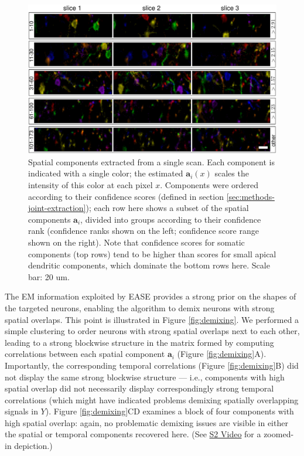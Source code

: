 \documentclass[10pt,letterpaper]{article}
\def \videoTwoURL{https://www.dropbox.com/s/jmkedq2f3nniy0a/demixing_example.avi?dl=0}
\begin{document}
{\begin{figure}[t!]
	\centering
	\includegraphics[width=1\textwidth]{Figs/fig_overlap_A.pdf}
	\caption{Spatial components extracted from a single scan.  Each component is indicated with a single color; the estimated $\bm{a}_i(x)$ scales the intensity of this color at each pixel $x$.  Components were ordered according to their confidence scores (defined in section \ref{sec:methods-joint-extraction}); each row here shows a subset of the spatial components $\bm{a}_i$, divided into groups according to their confidence rank (confidence ranks shown on the left; confidence score range shown on the right).  Note that confidence scores for somatic components (top rows) tend to be higher than scores for small apical dendritic components, which dominate the bottom rows here. Scale bar: 20 um. }
\label{fig:overlap}
\end{figure}


The EM information exploited by EASE provides a strong prior on the shapes of the targeted neurons, enabling the algorithm to demix neurons with strong spatial overlaps.  This point is illustrated in Figure \ref{fig:demixing}.  We performed a simple clustering to order neurons with strong spatial overlaps next to each other, leading to a strong blockwise structure in the matrix formed by computing correlations between each spatial component $\bm{a}_i$ (Figure \ref{fig:demixing}A).  Importantly, the corresponding temporal correlations (Figure \ref{fig:demixing}B) did not display the same strong blockwise structure --- i.e., components with high spatial overlap did not necessarily display correspondingly strong temporal correlations (which might have indicated problems demixing spatially overlapping signals in $Y$).  Figure \ref{fig:demixing}CD examines a block of four components with high spatial overlap: again, no problematic demixing issues are visible in either the spatial or temporal components recovered here. (See \href{\videoTwoURL}{S2 Video} for a zoomed-in depiction.) 

}
\end{document}
